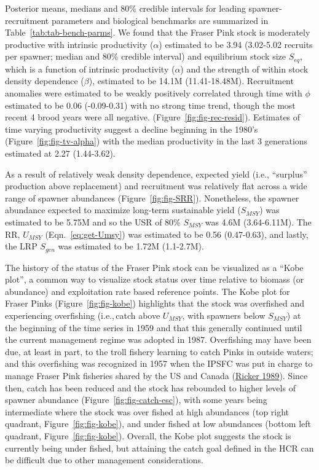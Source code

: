 \documentclass[11pt]{book}
\begin{document}
Posterior means, medians and 80\% credible intervals for leading spawner-recruitment parameters and biological benchmarks are summarized in Table~\ref{tab:tab-bench-parms}. We found that the Fraser Pink stock is moderately productive with intrinsic productivity (\(\alpha\)) estimated to be 3.94 (3.02-5.02 recruits per spawner; median and 80\% credible interval) and equilibrium stock size \(S_{eq}\), which is a function of intrinsic productivity (\(\alpha\)) and the strength of within stock density dependence (\(\beta\)), estimated to be 14.1M (11.41-18.48M). Recruitment anomalies were estimated to be weakly positively correlated through time with \(\phi\) estimated to be 0.06 (-0.09-0.31) with no strong time trend, though the most recent 4 brood years were all negative. (Figure~\ref{fig:fig-rec-resid}). Estimates of time varying productivity suggest a decline beginning in the 1980's (Figure~\ref{fig:fig-tv-alpha}) with the median productivity in the last 3 generations estimated at 2.27 (1.44-3.62).

As a result of relatively weak density dependence, expected yield (i.e., ``surplus'' production above replacement) and recruitment was relatively flat across a wide range of spawner abundances (Figure~\ref{fig:fig-SRR}). Nonetheless, the spawner abundance expected to maximize long-term sustainable yield (\(S_{MSY}\)) was estimated to be 5.75M and so the USR of 80\% \(S_{MSY}\) was 4.6M (3.64-6.11M). The RR, \(U_{MSY}\) (Eqn.~\ref{eq:get-Umsy}) was estimated to be 0.56 (0.47-0.63), and lastly, the LRP \(S_{gen}\) was estimated to be 1.72M (1.1-2.7M).

The history of the status of the Fraser Pink stock can be visualized as a ``Kobe plot'', a common way to visualize stock status over time relative to biomass (or abundance) and exploitation rate based reference points. The Kobe plot for Fraser Pinks (Figure~\ref{fig:fig-kobe}) highlights that the stock was overfished and experiencing overfishing (i.e.,\,catch above \(U_{MSY}\), with spawners below \(S_{MSY}\)) at the beginning of the time series in 1959 and that this generally continued until the current management regime was adopted in 1987. Overfishing may have been due, at least in part, to the troll fishery learning to catch Pinks in outside waters; and this overfishing was recognized in 1957 when the IPSFC was put in charge to manage Fraser Pink fisheries shared by the US and Canada (\protect\hyperlink{ref-rickerHistoryPresentState1989}{Ricker 1989}). Since then, catch has been reduced and the stock has rebounded to higher levels of spawner abundance (Figure~\ref{fig:fig-catch-esc}), with some years being intermediate where the stock was over fished at high abundances (top right quadrant, Figure~\ref{fig:fig-kobe}), and under fished at low abundances (bottom left quadrant, Figure~\ref{fig:fig-kobe}). Overall, the Kobe plot suggests the stock is currently being under fished, but attaining the catch goal defined in the HCR can be difficult due to other management considerations.
\end{document}

